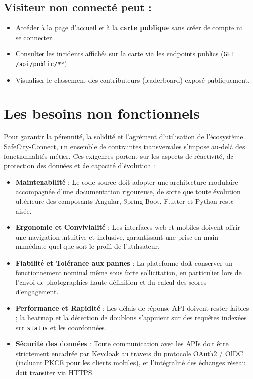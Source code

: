 \subsection{Visiteur non connecté peut :}
\begin{itemize}
    \item Accéder à la page d'accueil et à la \textbf{carte publique} sans créer de compte ni se connecter.
    \item Consulter les incidents affichés sur la carte via les endpoints publics (\texttt{GET /api/public/**}).
    \item Visualiser le classement des contributeurs (leaderboard) exposé publiquement.
\end{itemize}

\section{Les besoins non fonctionnels}
Pour garantir la pérennité, la solidité et l'agrément d'utilisation de l'écosystème SafeCity-Connect, un ensemble de contraintes transversales s'impose au-delà des fonctionnalités métier. Ces exigences portent sur les aspects de réactivité, de protection des données et de capacité d'évolution :
\begin{itemize}
    \item \textbf{Maintenabilité} : Le code source doit adopter une architecture modulaire accompagnée d'une documentation rigoureuse, de sorte que toute évolution ultérieure des composants Angular, Spring Boot, Flutter et Python reste aisée.
    \item \textbf{Ergonomie et Convivialité} : Les interfaces web et mobiles doivent offrir une navigation intuitive et inclusive, garantissant une prise en main immédiate quel que soit le profil de l'utilisateur.
    \item \textbf{Fiabilité et Tolérance aux pannes} : La plateforme doit conserver un fonctionnement nominal même sous forte sollicitation, en particulier lors de l'envoi de photographies haute définition et du calcul des scores d'engagement.
    \item \textbf{Performance et Rapidité} : Les délais de réponse API doivent rester faibles ; la heatmap et la détection de doublons s'appuient sur des requêtes indexées sur \texttt{status} et les coordonnées.
    \item \textbf{Sécurité des données} : Toute communication avec les APIs doit être strictement encadrée par Keycloak au travers du protocole OAuth2 / OIDC (incluant PKCE pour les clients mobiles), et l'intégralité des échanges réseau doit transiter via HTTPS.
\end{itemize}

